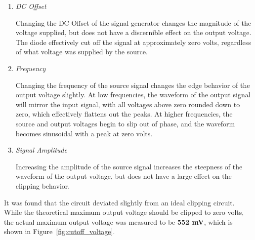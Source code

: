 \documentclass[twocolumn,english]{IEEEtran}
\begin{document}
\begin{enumerate}

  \item \textit{DC Offset}

    Changing the DC Offset of the signal generator changes the magnitude of the voltage supplied, but does not have a discernible effect on the output voltage. The diode effectively cut off the signal at approximately zero volts, regardless of what voltage was supplied by the source. \\

  \item \textit{Frequency}

    Changing the frequency of the source signal changes the edge behavior of the output voltage slightly.
    At low frequencies, the waveform of the output signal will mirror the input signal, with all voltages above zero rounded down to zero, which effectively flattens out the peaks.
    At higher frequencies, the source and output voltages begin to slip out of phase, and the waveform becomes sinusoidal with a peak at zero volts. \\

  \item \textit{Signal Amplitude}

    Increasing the amplitude of the source signal increases the steepness of the waveform of the output voltage, but does not have a large effect on the clipping behavior.
\end{enumerate}
It was found that the circuit deviated slightly from an ideal clipping circuit. While the theoretical maximum output voltage should be clipped to zero volts, the actual maximum output voltage was measured to be \textbf{552 mV}, which is shown in Figure~\ref{fig:cutoff_voltage}.
\end{document}
